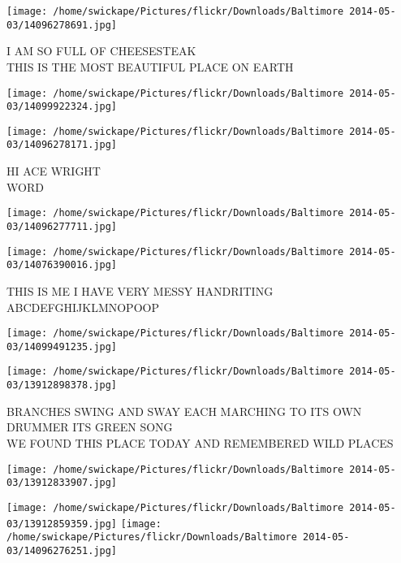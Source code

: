 \documentclass[10pt,letterpaper]{article}
\begin{document}
\vspace{0.25in}
\texttt{[image: /home/swickape/Pictures/flickr/Downloads/Baltimore 2014-05-03/14096278691.jpg]}

I AM SO FULL OF CHEESESTEAK\\
THIS IS THE MOST BEAUTIFUL PLACE ON EARTH\\
\pagebreak

\texttt{[image: /home/swickape/Pictures/flickr/Downloads/Baltimore 2014-05-03/14099922324.jpg]}

\vspace{0.25in}
\texttt{[image: /home/swickape/Pictures/flickr/Downloads/Baltimore 2014-05-03/14096278171.jpg]}

HI ACE WRIGHT\\
WORD\\
\pagebreak

\texttt{[image: /home/swickape/Pictures/flickr/Downloads/Baltimore 2014-05-03/14096277711.jpg]}

\vspace{0.25in}
\texttt{[image: /home/swickape/Pictures/flickr/Downloads/Baltimore 2014-05-03/14076390016.jpg]}

THIS IS ME I HAVE VERY MESSY HANDRITING\\
ABCDEFGHIJKLMNOPOOP\\
\pagebreak

\texttt{[image: /home/swickape/Pictures/flickr/Downloads/Baltimore 2014-05-03/14099491235.jpg]}

\vspace{0.25in}
\texttt{[image: /home/swickape/Pictures/flickr/Downloads/Baltimore 2014-05-03/13912898378.jpg]}

BRANCHES SWING AND SWAY EACH MARCHING TO ITS OWN DRUMMER ITS GREEN SONG\\
WE FOUND THIS PLACE TODAY AND REMEMBERED WILD PLACES\\
\pagebreak

\texttt{[image: /home/swickape/Pictures/flickr/Downloads/Baltimore 2014-05-03/13912833907.jpg]}

\vspace{0.25in}
\texttt{[image: /home/swickape/Pictures/flickr/Downloads/Baltimore 2014-05-03/13912859359.jpg]}
\texttt{[image: /home/swickape/Pictures/flickr/Downloads/Baltimore 2014-05-03/14096276251.jpg]}
\end{document}
